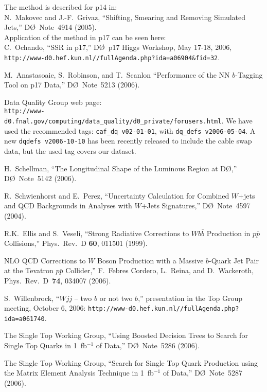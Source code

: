 \documentclass[aps]{revtex4}
\newcommand{\dzero}     {D\O}
\newcommand{\ppbar}     {\mbox{$p\bar{p}$}}
\begin{document}
\begin{thebibliography}{99.}
The method is described for p14 in:\\
N.~Makovec and J.-F.~Grivaz,
``Shifting, Smearing and Removing Simulated Jets,''
{\dzero}~Note~4914 (2005).\\
Application of the method in p17 can be seen here:\\
C.~Ochando, 
``SSR in p17,'' {\dzero}~p17 Higgs Workshop, May 17-18, 2006,\\
\texttt{http://www-d0.hef.kun.nl//fullAgenda.php?ida=a06904\&fid=32}.

M.~Anastasoaie, S.~Robinson, and T.~Scanlon
``Performance of the NN $b$-Tagging Tool on p17 Data,''
{\dzero}~Note~5213 (2006).

Data Quality Group web page:\\
\texttt{http://www-d0.fnal.gov/computing/data\_quality/d0\_private/forusers.html}.
We have used the recommended tags: \texttt{caf\_dq v02-01-01}, with
\texttt{dq\_defs v2006-05-04}. A new \texttt{dq\-defs v2006-10-10} has
been recently released to include the cable swap data, but the used
tag covers our dataset.

H.~Schellman, ``The Longitudinal Shape of the Luminous Region at
{\dzero},'' {\dzero}~Note~5142 (2006).

R.~Schwienhorst and E.~Perez,
``Uncertainty Calculation for Combined $W$+jets and QCD Backgrounds
in Analyses with $W$+Jets Signatures,''
{\dzero}~Note~4597 (2004).

R.K.~Ellis and S.~Veseli,
``Strong Radiative Corrections to $Wb\bar{b}$ Production in {\ppbar}
Collisions,''
Phys.\ Rev.\ D {\bf 60}, 011501 (1999).

NLO QCD Corrections to $W$ Boson Production with a Massive $b$-Quark
Jet Pair at the Tevatron {\ppbar} Collider,''
F.~Febres Cordero, L.~Reina, and D.~Wackeroth,
Phys.\ Rev.\ D~{\bf 74}, 034007 (2006).

S.~Willenbrock,
``$Wjj$ -- two $b$ or not two $b$,''
presentation in the Top Group meeting, October 6, 2006:
\texttt{http://www-d0.hef.kun.nl//fullAgenda.php?ida=a061740}.

The Single Top Working Group,
``Using Boosted Decision Trees to Search for Single Top Quarks in
1~fb$^{-1}$ of Data,''
{\dzero}~Note~5286 (2006).

The Single Top Working Group,
``Search for Single Top Quark Production using the Matrix Element
Analysis Technique in 1~fb$^{-1}$ of Data,''
{\dzero}~Note~5287 (2006).


\end{thebibliography}
\end{document}
